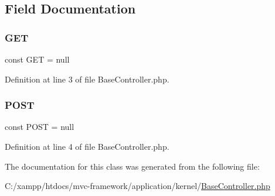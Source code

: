 \subsection{Field Documentation}
\hypertarget{class_base_controller_a036e3adfeab59b468951a7ebb383f953}{}\label{class_base_controller_a036e3adfeab59b468951a7ebb383f953} 
\subsubsection{\texorpdfstring{G\+ET}{GET}}
{\footnotesize\ttfamily const G\+ET = null}



Definition at line 3 of file Base\+Controller.\+php.

\hypertarget{class_base_controller_a266e25cc4bc4d1fc753aede118504cf9}{}\label{class_base_controller_a266e25cc4bc4d1fc753aede118504cf9} 
\subsubsection{\texorpdfstring{P\+O\+ST}{POST}}
{\footnotesize\ttfamily const P\+O\+ST = null}



Definition at line 4 of file Base\+Controller.\+php.



The documentation for this class was generated from the following file\+:\begin{DoxyCompactItemize}
\item 
C\+:/xampp/htdocs/mvc-\/framework/application/kernel/\hyperlink{_base_controller_8php}{Base\+Controller.\+php}\end{DoxyCompactItemize}
